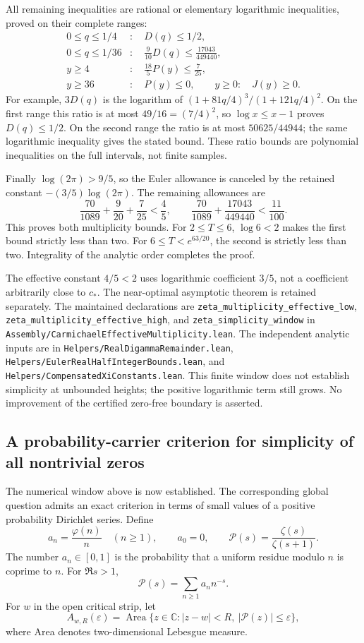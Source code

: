 All remaining inequalities are rational or elementary logarithmic
inequalities, proved on their complete ranges:
\begin{align*}
 0\le q\le1/4&:\quad D(q)\le1/2,\\
 0\le q\le1/36&:\quad \frac9{10}D(q)\le\frac{17043}{449440},\\
 y\ge4&:\quad \frac{18}{5}P(y)\le\frac7{25},\\
 y\ge36&:\quad P(y)\le0,\qquad
 y\ge0:\quad J(y)\ge0.
\end{align*}
For example, \(3D(q)\) is the logarithm of
\((1+81q/4)^3/(1+121q/4)^2\). On the first range this ratio is at
most \(49/16=(7/4)^2\), so \(\log x\le x-1\) proves
\(D(q)\le1/2\). On the second range the ratio is at most
\(50625/44944\); the same logarithmic inequality gives the stated
bound. These ratio bounds are polynomial inequalities on the full
intervals, not finite samples.

Finally \(\log(2\pi)>9/5\), so the Euler allowance is canceled
by the retained constant \(-(3/5)\log(2\pi)\). The remaining
allowances are
\[
 \frac{70}{1089}+\frac9{20}+\frac7{25}<\frac45,
 \qquad
 \frac{70}{1089}+\frac{17043}{449440}<\frac{11}{100}.
\]
This proves both multiplicity bounds. For \(2\le T\le6\),
\(\log6<2\) makes the first bound strictly less than two.
For \(6\le T<e^{63/20}\), the second is strictly less than two.
Integrality of the analytic order completes the proof.

The effective constant \(4/5<2\) uses logarithmic coefficient
\(3/5\), not a coefficient arbitrarily close to \(c_*\).
The near-optimal asymptotic theorem is retained separately.
The maintained declarations are
\texttt{zeta\_multiplicity\_effective\_low},
\texttt{zeta\_multiplicity\_effective\_high}, and
\texttt{zeta\_simplicity\_window} in
\texttt{Assembly/CarmichaelEffectiveMultiplicity.lean}.
The independent analytic inputs are in
\texttt{Helpers/RealDigammaRemainder.lean},
\texttt{Helpers/EulerRealHalfIntegerBounds.lean}, and
\texttt{Helpers/CompensatedXiConstants.lean}.
This finite window does not establish simplicity at unbounded heights;
the positive logarithmic term still grows. No improvement of the
certified zero-free boundary is asserted.

\subsection{A probability-carrier criterion for simplicity of all nontrivial zeros}

The numerical window above is now established. The corresponding global
question admits an exact criterion in terms of small values of a positive
probability Dirichlet series. Define
\[
 a_n=\frac{\varphi(n)}n\quad(n\ge1),\qquad a_0=0,\qquad
 \mathcal P(s)=\frac{\zeta(s)}{\zeta(s+1)}.
\]
The number \(a_n\in[0,1]\) is the probability that a uniform residue modulo
\(n\) is coprime to \(n\). For \(\Re s>1\),
\[
 \mathcal P(s)=\sum_{n\ge1}a_n n^{-s}.
\]
For \(w\) in the open critical strip, let
\[
 A_{w,R}(\varepsilon)=\operatorname{Area}
 \{z\in\mathbb C:|z-w|<R,\ |\mathcal P(z)|\le\varepsilon\},
\]
where Area denotes two-dimensional Lebesgue measure.


